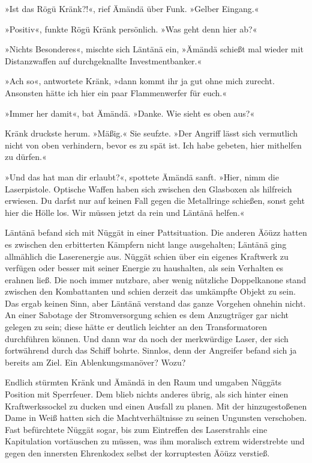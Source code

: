 »Ist das Rögü Kränk?!«, rief Ämändä über Funk. »Gelber Eingang.«

»Positiv«, funkte Rögü Kränk persönlich. »Was geht denn hier ab?«

»Nichts Besonderes«, mischte sich Läntänä ein, »Ämändä schießt mal wieder mit Distanzwaffen auf durchgeknallte Investmentbanker.«

»Ach so«, antwortete Kränk, »dann kommt ihr ja gut ohne mich zurecht. Ansonsten hätte ich hier ein paar Flammenwerfer für euch.«

»Immer her damit«, bat Ämändä. »Danke. Wie sieht es oben aus?«

Kränk druckste herum. »Mäßig.« Sie seufzte. »Der Angriff lässt sich vermutlich nicht von oben verhindern, bevor es zu spät ist. Ich habe gebeten, hier mithelfen zu dürfen.«

»Und das hat man dir erlaubt?«, spottete Ämändä sanft. »Hier, nimm die Laserpistole. Optische Waffen haben sich zwischen den Glasboxen als hilfreich erwiesen. Du darfst nur auf keinen Fall gegen die Metallringe schießen, sonst geht hier die Hölle los. Wir müssen jetzt da rein und Läntänä helfen.«

Läntänä befand sich mit Nüggät in einer Pattsituation. Die anderen Äöüzz hatten es zwischen den erbitterten Kämpfern nicht lange ausgehalten; Läntänä ging allmählich die Laserenergie aus. Nüggät schien über ein eigenes Kraftwerk zu verfügen oder besser mit seiner Energie zu haushalten, als sein Verhalten es erahnen ließ. Die noch immer nutzbare, aber wenig nützliche Doppelkanone stand zwischen den Kombattanten und schien derzeit das umkämpfte Objekt zu sein. Das ergab keinen Sinn, aber Läntänä verstand das ganze Vorgehen ohnehin nicht. An einer Sabotage der Stromversorgung schien es dem Anzugträger gar nicht gelegen zu sein; diese hätte er deutlich leichter an den Transformatoren durchführen können. Und dann war da noch der merkwürdige Laser, der sich fortwährend durch das Schiff bohrte. Sinnlos, denn der Angreifer befand sich ja bereits am Ziel. Ein Ablenkungsmanöver? Wozu?

Endlich stürmten Kränk und Ämändä in den Raum und umgaben Nüggäts Position mit Sperrfeuer. Dem blieb nichts anderes übrig, als sich hinter einen Kraftwerkssockel zu ducken und einen Ausfall zu planen. Mit der hinzugestoßenen Dame in Weiß hatten sich die Machtverhältnisse zu seinen Ungunsten verschoben. Fast befürchtete Nüggät sogar, bis zum Eintreffen des Laserstrahls eine Kapitulation vortäuschen zu müssen, was ihm moralisch extrem widerstrebte und gegen den innersten Ehrenkodex selbst der korruptesten Äöüzz verstieß.

